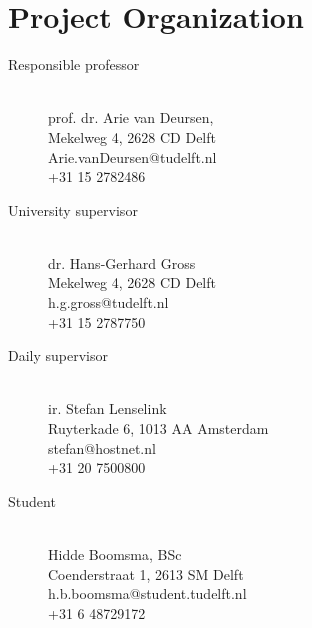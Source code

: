 \documentclass[a4paper,10pt,twocolumn]{article}
\begin{document}
\section{Project Organization}
\begin{description}
 \item [Responsible professor]  \hfill \\
  prof. dr. Arie van Deursen,\\ Mekelweg 4, 2628 CD Delft\\ Arie.vanDeursen@tudelft.nl\\+31 15 2782486              
 \item [University supervisor]  \hfill \\
 dr. Hans-Gerhard Gross\\ Mekelweg 4, 2628 CD Delft\\ h.g.gross@tudelft.nl\\+31 15 2787750              
 \item [Daily supervisor]   \hfill \\
  ir. Stefan Lenselink\\Ruyterkade 6, 1013 AA Amsterdam\\stefan@hostnet.nl\\+31 20 7500800
 \item [Student]   \hfill \\
  Hidde Boomsma, BSc\\Coenderstraat 1, 2613 SM Delft\\h.b.boomsma@student.tudelft.nl\\+31 6 48729172
\end{description}

\raggedright


\end{document}
